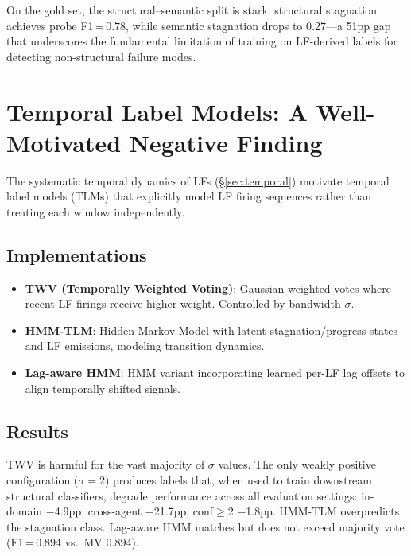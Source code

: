 \documentclass[11pt]{article}
\begin{document}
On the gold set, the structural--semantic split is stark: structural stagnation achieves probe F1\,=\,0.78, while semantic stagnation drops to 0.27---a 51pp gap that underscores the fundamental limitation of training on LF-derived labels for detecting non-structural failure modes.

\section{Temporal Label Models: A Well-Motivated Negative Finding}
\label{sec:tlm}

The systematic temporal dynamics of LFs (\S\ref{sec:temporal}) motivate temporal label models (TLMs) that explicitly model LF firing sequences rather than treating each window independently.

\subsection{Implementations}

\begin{itemize}[leftmargin=*,itemsep=1pt]
\item \textbf{TWV (Temporally Weighted Voting)}: Gaussian-weighted votes where recent LF firings receive higher weight. Controlled by bandwidth $\sigma$.
\item \textbf{HMM-TLM}: Hidden Markov Model with latent stagnation/progress states and LF emissions, modeling transition dynamics.
\item \textbf{Lag-aware HMM}: HMM variant incorporating learned per-LF lag offsets to align temporally shifted signals.
\end{itemize}

\subsection{Results}

TWV is harmful for the vast majority of $\sigma$ values. The only weakly positive configuration ($\sigma\!=\!2$) produces labels that, when used to train downstream structural classifiers, degrade performance across all evaluation settings: in-domain $-$4.9pp, cross-agent $-$21.7pp, conf$\geq$2 $-$1.8pp. HMM-TLM overpredicts the stagnation class. Lag-aware HMM matches but does not exceed majority vote (F1\,=\,0.894 vs.\ MV 0.894).
\end{document}

